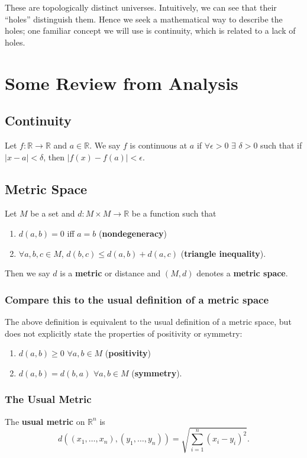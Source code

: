 \documentclass[12pt]{amsart}
\begin{document}
\noindent These are topologically distinct universes. Intuitively, we can see that their ``holes'' distinguish them. Hence we seek a mathematical way to describe the holes; one familiar concept we will use is continuity, which is related to a lack of holes.

\section{Some Review from Analysis}

\subsection{Continuity} Let $f : \mathbb{R} \rightarrow \mathbb{R}$ and $a \in \mathbb{R}$. We say $f$ is continuous at $a$ if $\forall \epsilon > 0$ $\exists$ $\delta > 0$ such that if $|x-a|<\delta$, then $|f(x)-f(a)|<\epsilon$. 

\subsection{Metric Space} Let $M$ be a set and $d: M \times M \rightarrow \mathbb{R}$ be a function such that 
	\begin{enumerate}
		\item $d(a,b)=0$ iff $a=b$ (\textbf{nondegeneracy})
		\item $\forall a,b,c \in M$, $d(b,c) \leq d(a,b) + d(a,c)$ (\textbf{triangle inequality}).
	\end{enumerate}
Then we say $d$ is a \textbf{metric} or distance and $(M,d)$ denotes a \textbf{metric space}. 

\subsubsection{Compare this to the usual definition of a metric space} The above definition is equivalent to the usual definition of a metric space, but does not explicitly state the properties of positivity or symmetry:
	\begin{enumerate}
		\item $d(a,b) \geq 0$ $\forall a,b \in M$ (\textbf{positivity})
		\item $d(a,b) = d(b,a)$ $\forall a,b \in M$ (\textbf{symmetry}).
	\end{enumerate}

\subsubsection{The Usual Metric} The \textbf{usual metric} on $\mathbb{R}^{n}$ is
	\begin{displaymath}
		d((x_1,\ldots,x_n),(y_1,\ldots,y_n)) = \sqrt{\sum_{i=1}^n (x_i-y_i)^2}.
	\end{displaymath}
\end{document}
